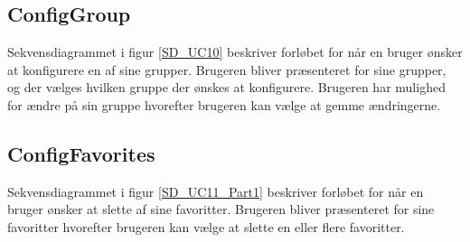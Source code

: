 
\subsection*{ConfigGroup}
Sekvensdiagrammet i figur \ref{SD_UC10} beskriver forløbet for når en bruger ønsker at konfigurere en af sine grupper. Brugeren bliver præsenteret for sine grupper, og der vælges hvilken gruppe der ønskes at konfigurere. Brugeren har mulighed for ændre på sin gruppe hvorefter brugeren kan vælge at gemme ændringerne.


\subsection*{ConfigFavorites}
Sekvensdiagrammet i figur \ref{SD_UC11_Part1} beskriver forløbet for når en bruger ønsker at slette af sine favoritter. Brugeren bliver præsenteret for sine favoritter hvorefter brugeren kan vælge at slette en eller flere favoritter.

